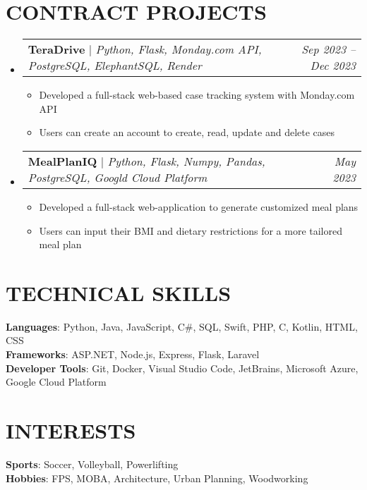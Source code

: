 \documentclass[letterpaper,11pt]{article}
\makeatletter
\newcommand{\resumeItem}[1]{
  \item\small{
    {#1 \vspace{-2pt}}
  }
}
\newcommand{\resumeProjectHeading}[2]{
    \item
    \begin{tabular*}{0.97\textwidth}{l@{\extracolsep{\fill}}r}
      \small#1 & #2 \\
    \end{tabular*}\vspace{-7pt}
}
\newcommand{\resumeSubHeadingListStart}{\begin{itemize}[leftmargin=0.15in, label={}]}
\newcommand{\resumeSubHeadingListEnd}{\end{itemize}}
\newcommand{\resumeItemListStart}{\begin{itemize}}
\newcommand{\resumeItemListEnd}{\end{itemize}\vspace{-5pt}}
\makeatother
\begin{document}
\section{CONTRACT PROJECTS}
    \resumeSubHeadingListStart
      \resumeProjectHeading
          {\textbf{TeraDrive} $|$ \emph{Python, Flask, Monday.com API, PostgreSQL, ElephantSQL, Render}}{\textit{\small{Sep 2023 -- Dec 2023}}}
          \resumeItemListStart
            \resumeItem{Developed a full-stack web-based case tracking system with Monday.com API}
            \resumeItem{Users can create an account to create, read, update and delete cases}
          \resumeItemListEnd
      \resumeProjectHeading
          {\textbf{MealPlanIQ} $|$ \emph{Python, Flask, Numpy, Pandas, PostgreSQL, Googld Cloud Platform}}{\textit{\small{May 2023}}}
          \resumeItemListStart
            \resumeItem{Developed a full-stack web-application to generate customized meal plans}
            \resumeItem{Users can input their BMI and dietary restrictions for a more tailored meal plan}
          \resumeItemListEnd
    \resumeSubHeadingListEnd

\section{TECHNICAL SKILLS}
 \begin{itemize}[leftmargin=0.15in, label={}]
    \small{\item{
     \textbf{Languages}{: Python, Java, JavaScript, C\#, SQL, Swift, PHP, C, Kotlin, HTML, CSS} \\
     \textbf{Frameworks}{: ASP.NET, Node.js, Express, Flask, Laravel} \\
     \textbf{Developer Tools}{: Git, Docker, Visual Studio Code, JetBrains, Microsoft Azure, Google Cloud Platform} \\
    }}
 \end{itemize}

\section{INTERESTS}
 \begin{itemize}[leftmargin=0.15in, label={}]
    \small{\item{
     \textbf{Sports}{: Soccer, Volleyball, Powerlifting} \\
     \textbf{Hobbies}{: FPS, MOBA, Architecture, Urban Planning, Woodworking} \\
    }}
 \end{itemize}

\end{document}
